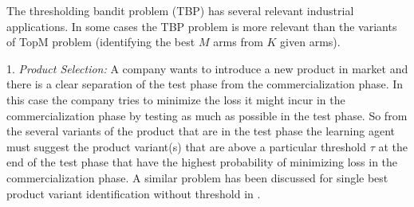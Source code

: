 The thresholding bandit problem (TBP) has several relevant industrial applications. In some cases the TBP problem is more relevant than the variants of TopM problem (identifying the best $M$ arms from $K$ given arms).


	1. \emph{Product Selection:} A company wants to introduce a new product in market and there is a clear separation of the test phase from the commercialization phase. In this case the company tries to minimize the loss it might incur in the commercialization phase by testing as much as possible in the test phase. So from the several variants of the product that are in the test phase the learning agent must suggest the product variant(s) that are above a particular threshold $\tau$ at the end of the test phase that have the highest probability of minimizing loss in the commercialization phase. A similar problem has been discussed for single best product variant identification without threshold in \cite{bubeck2011pure}. 

